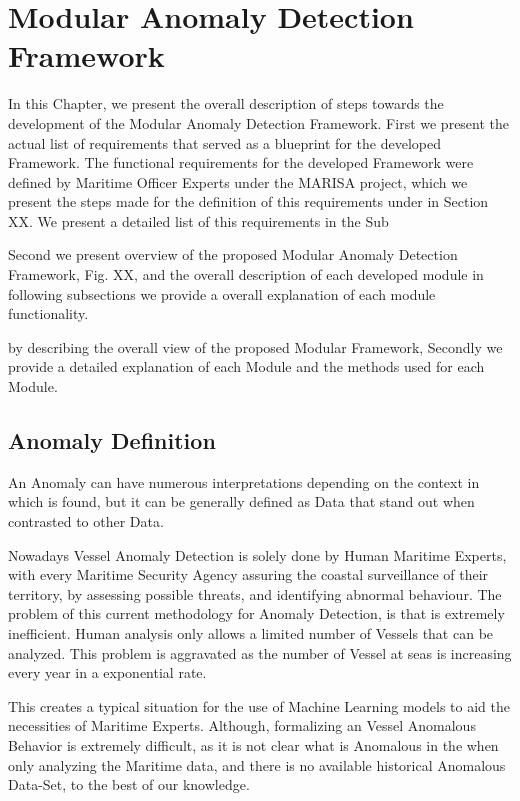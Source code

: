 \chapter{Modular Anomaly Detection Framework}
\label{chapter:Chapter 3}

In this Chapter, we present the overall description of steps towards the development of the Modular Anomaly Detection Framework. First we present the actual list of requirements that served as a blueprint for the developed Framework. The functional requirements for the developed Framework were defined by Maritime Officer Experts under the MARISA project, which we present the steps made for the definition of this requirements under in Section XX. 
We present a detailed list of this requirements in the Sub

Second we present overview of the proposed Modular Anomaly Detection Framework, Fig. XX, and the overall description of each developed module in  following subsections we provide a overall explanation of each module functionality. 

by describing the overall view of the proposed Modular Framework, Secondly we provide a detailed explanation of each Module and the methods used for each Module. 


\section{Anomaly Definition}
An Anomaly can have numerous interpretations depending on the context in which is found, but it can be generally defined as Data that stand out when contrasted to other Data.

Nowadays Vessel Anomaly Detection is solely done by Human Maritime Experts, with every Maritime Security Agency assuring the coastal surveillance of their territory, by assessing possible threats, and identifying abnormal behaviour. 
The problem of this current methodology for Anomaly Detection, is that is extremely inefficient. Human analysis only allows a limited number of Vessels that can be analyzed. This problem is aggravated as the number of Vessel at seas is increasing every year in a exponential rate. 

This creates a typical situation for the use of Machine Learning models to aid the necessities of Maritime Experts.
Although, formalizing an Vessel Anomalous Behavior is extremely difficult, as it is not clear what is Anomalous in the when only analyzing the Maritime data, and there is no available historical Anomalous Data-Set, to the best of our knowledge.

